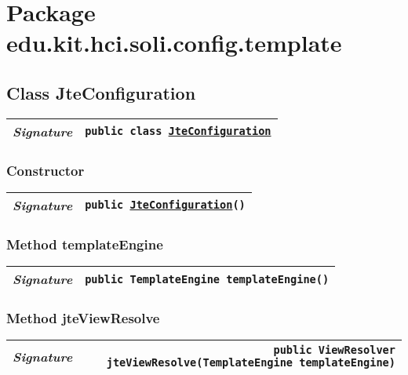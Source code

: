 

\section{Package edu.kit.hci.soli.config.template}
\begin{adjustwidth}{1.5em}{0pt}
  \subsection{Class JteConfiguration\label{edu.kit.hci.soli.config.template.JteConfiguration} }
  \begin{adjustwidth}{1.5em}{0pt}
    {\begin{tabularx}{1.0\linewidth}{@{}l R@{}}
      \emph{Signature} & \texttt{public  class \texttt{\hyperref[edu.kit.hci.soli.config.template.JteConfiguration]{\texttt{JteConfiguration}}}} \\
      \hline
  
    \end{tabularx}}\subsubsection{Constructor\label{edu.kit.hci.soli.config.template.JteConfiguration@edu.kit.hci.soli.config.template.JteConfiguration()}}
    \begin{adjustwidth}{1.5em}{0pt}
      {\begin{tabularx}{1.0\linewidth}{@{}l R@{}}
        \emph{Signature} & \texttt{public \texttt{\hyperref[edu.kit.hci.soli.config.template.JteConfiguration]{\texttt{JteConfiguration}}}()} \\
        \hline
  
      \end{tabularx}}
    \end{adjustwidth}\subsubsection{Method templateEngine\label{edu.kit.hci.soli.config.template.JteConfiguration@templateEngine()}}
    \begin{adjustwidth}{1.5em}{0pt}
      {\begin{tabularx}{1.0\linewidth}{@{}l R@{}}
        \emph{Signature} & \texttt{public \texttt{TemplateEngine} templateEngine()} \\
        \hline
  
      \end{tabularx}}
    \end{adjustwidth}\subsubsection{Method jteViewResolve\label{edu.kit.hci.soli.config.template.JteConfiguration@jteViewResolve(TemplateEngine)}}
    \begin{adjustwidth}{1.5em}{0pt}
      {\begin{tabularx}{1.0\linewidth}{@{}l R@{}}
        \emph{Signature} & \texttt{public \texttt{ViewResolver} jteViewResolve(\texttt{TemplateEngine} templateEngine)} \\
        \hline
  

\end{tabularx}}
\end{adjustwidth}
\end{adjustwidth}
\end{adjustwidth}
